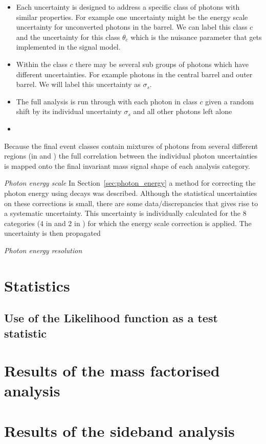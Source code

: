 \begin{itemize}
  \item Each uncertainty is designed to address a specific class of photons with similar properties. For example one uncertainty might be the energy scale uncertainty for unconverted photons in the barrel. We can label this class $c$ and the uncertainty for this class $\theta_{c}$ which is the nuisance parameter that gets implemented in the signal model.
  \item Within the class $c$ there may be several sub groups of photons which have different uncertainties. For example photons in the central barrel and outer barrel. We will label this uncertainty as $\sigma_{s}$.
  \item The full analysis is run through with each photon in class $c$ given a random shift by its individual uncertainty $\sigma_{s}$ and all other photons left alone 
  \item 
\end{itemize}


Because the final event classes contain mixtures of photons from several different regions (in \eta and \rnine) the full correlation between the individual photon uncertainties is mapped onto the final invariant mass signal shape of each analysis category.  

\textit{Photon energy scale}
In Section~\ref{sec:photon_energy} a method for correcting the photon energy using \Zee decays was described. Although the statistical uncertainties on these corrections is small, there are some data/\MC discrepancies that gives rise to a systematic uncertainty. This uncertainty is individually calculated for the 8 categories (4 in \eta and 2 in \rnine) for which the energy scale correction is applied. The uncertainty is then propagated   

\textit{Photon energy resolution}

\section{Statistics}
\subsection{Use of the Likelihood function as a test statistic}

\section{Results of the mass factorised analysis}

\section{Results of the sideband analysis}

